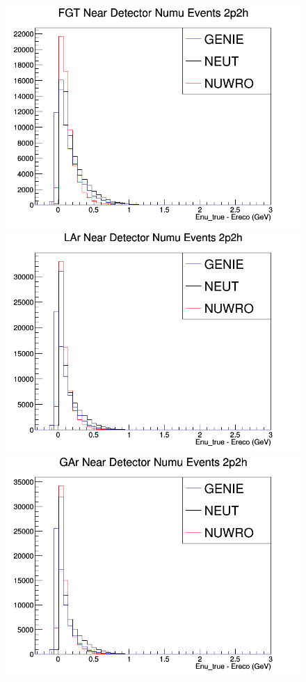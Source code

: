 \documentclass[12pt]{article}
\begin{document}
\begin{figure}[h]
\endminipage
{}
\includegraphics[width=\linewidth]{Ereco_Etrue/numu_FGT_2p2h.png}
\endminipage
{}
\includegraphics[width=\linewidth]{Ereco_Etrue/numu_LAr_2p2h.png}
\endminipage
{}
\includegraphics[width=\linewidth]{Ereco_Etrue/numu_GAr_2p2h.png}

\end{figure}
\end{document}
